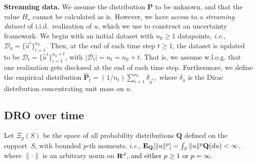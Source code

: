\documentclass[12pt]{article}
\renewcommand{\paragraph}[1]{\textbf{#1.}\;}
\newcommand{\bnote}[1]{\textcolor{purple}{\textbf{[B: #1]}}}
\newcommand{\IrinaNote}[1]{\textcolor{red}{\textbf{[I: #1]}}}
\newcommand{\ie}{{\it i.e.}}
\newcommand{\reals}{{\bf R}}
\newcommand{\prob}{{\mathbf P}}
\newcommand{\Expect}{{\mbox{\bf E}}}
\newcommand{\supp}{S}
\newcommand{\unc}{u}
\newcommand{\barp}{p}
\newcommand{\RC}[1]{\textcolor{black}{#1}}
\newcommand{\RC}[1]{\textcolor{blue}{#1}}
\begin{document}

\paragraph{Streaming data}
We assume the distribution $\prob$ to be unknown, and that the value $H_\star$ cannot be calculated as is. 
However, we have access to a {\it streaming dataset} of i.i.d.\ realization of $u$, which we use to construct an uncertainty framework. 
We begin with an initial dataset with $n_0 \geq 1$ datapoints, \ie, $\mathcal{D}_0 = \{\hat{u}^i\}_{i=1}^{n_0}$. Then, at the end of each time step $t \geq 1$, the dataset is updated to be $\mathcal{D}_t = \{\hat{\unc}^{i}\}_{i=1}^{n_0 + t}$, with $|\mathcal{D}_t| = n_t = n_0 + t$. That is, we assume w.l.o.g. that one realization gets disclosed at the end of each time step. Furthermore, we define the empirical distribution $\hat{\prob}_t = (1/{n_t})\sum_{i=1}^{n_t} \delta_{\hat{\unc}^{i}},$
where $\delta_u$ is the Dirac distribution concentrating unit mass on $u$.




\subsection{\Gls{DRO} over time}
\label{sec:over_time}
Let $\Xi_{\barp}(S)$ be the space of all probability distributions $\mathbf{Q}$ defined on the support~$\supp$, with bounded $\barp$-th moments, \ie,
$\Expect_\mathbf{Q}[\|u\|^{\barp}] = \int_S\|u\|^{\barp}\mathbf{Q}(du) < \infty$, where $\|\cdot\|$ is an arbitrary norm on $\reals^d$, \RC{and either $\barp\geq 1$ or $\barp = \infty$. 
}
\end{document}
